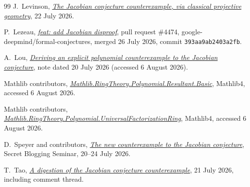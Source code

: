 \documentclass[11pt,reqno]{amsart}
\theoremstyle{definition}
\theoremstyle{remark}
\begin{document}
\begin{thebibliography}{99}
J.~Levinson,
\emph{\href{https://levjake.wordpress.com/2026/07/22/the-jacobian-conjecture-counterexample/}
{The Jacobian conjecture counterexample, via classical projective
geometry}},
22 July 2026.

P.~Lezeau,
\emph{\href{https://github.com/google-deepmind/formal-conjectures/pull/4474}
{feat: add Jacobian disproof}},
pull request \#4474, google-deepmind/formal-conjectures, merged
26 July 2026, commit \texttt{393aa9ab2403a2fb}.

A.~Lou,
\emph{\href{https://aaronlou.com/jacobian_counterexample_derivation.pdf}
{Deriving an explicit polynomial counterexample to the Jacobian
conjecture}},
note dated 20 July 2026 (accessed 6 August 2026).

Mathlib contributors,
\emph{\href{https://leanprover-community.github.io/mathlib4_docs/Mathlib/RingTheory/Polynomial/Resultant/Basic.html}
{Mathlib.RingTheory.Polynomial.Resultant.Basic}},
Mathlib4, accessed 6 August 2026.

Mathlib contributors,
\emph{\href{https://leanprover-community.github.io/mathlib4_docs/Mathlib/RingTheory/Polynomial/UniversalFactorizationRing.html}
{Mathlib.RingTheory.Polynomial.UniversalFactorizationRing}},
Mathlib4, accessed 6 August 2026.

D.~Speyer and contributors,
\emph{\href{https://sbseminar.wordpress.com/2026/07/20/the-new-counterexample-to-the-jacobian-conjecture/}
{The new counterexample to the Jacobian conjecture}},
Secret Blogging Seminar, 20--24 July 2026.

T.~Tao,
\emph{\href{https://terrytao.wordpress.com/2026/07/21/a-digestion-of-the-jacobian-conjecture-counterexample/}
{A digestion of the Jacobian conjecture counterexample}},
21 July 2026, including comment thread.

\end{thebibliography}
\endgroup
\end{document}
